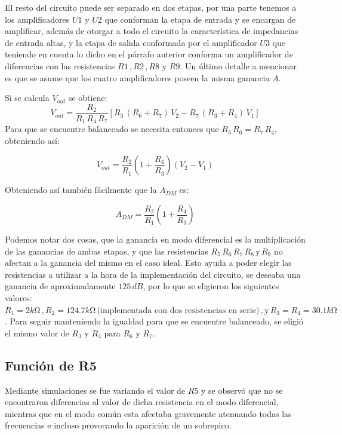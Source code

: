 \documentclass[11pt, a4paper]{article}
\begin{document}
	El resto del circuito puede ser separado en dos etapas, por una parte tenemos a los amplificadores $\mathit{U1}$ y $\mathit{U2}$ que conforman la etapa de entrada y se encargan de amplificar, además de otorgar a todo el circuito la característica de impedancias de entrada altas, y la etapa de salida conformada por el amplificador $\mathit{U3}$ que teniendo en cuenta lo dicho en el párrafo anterior conforma un amplificador de diferencias con las resistencias $R1 \, , R2 \, , R8$ y $R9$. Un último detalle a mencionar es que se asume que los cuatro amplificadores poseen la misma ganancia $A$.

	Si se calcula $V_{out}$ se obtiene:
\begin{equation}
V_{out} = \dfrac{R_2}{R_1 \, R_4 \, R_7} [R_3 \, (R_6 + R_7) \,V_2 - R_7 \, (R_3 + R_4) \,V_1]
\label{eq:Vout ideal}
\end{equation}
	Para que se encuentre balanceado se necesita entonces que $R_3 \, R_6 = R_7 \, R_4$, obteniendo así:

\begin{equation}
V_{out} = \dfrac{R_2}{R_1} \left( 1 + \dfrac{R_4}{R_3} \right) (V_2 - V_1)
\label{eq:Vout ideal balanceado}
\end{equation}

	Obteniendo así también fácilmente que la $A_{DM}$ es:
	
\begin{equation}
A_{DM} = \dfrac{R_2}{R_1} \left( 1 + \dfrac{R_4}{R_3} \right)
\label{eq:ADM caso ideal}
\end{equation}

	Podemos notar dos cosas, que la ganancia en modo diferencial es la multiplicación de las ganancias de ambas etapas, y que las resistencias $R_5 \, R_6 \, R_7 \, R_8 \, \text{y} \, R_9$ no afectan a la ganancia del mismo en el caso ideal.
	Esto ayuda a poder elegir las resistencias a utilizar a la hora de la implementación del circuito, se deseaba una ganancia de aproximadamente $125 \, dB$, por lo que se eligieron los siguientes valores: $R_1 = 2k \si{\ohm} \, , R_2 = 124.7k \si{\ohm} \, \text{(implementada con dos resistencias en serie)} \, , \text{y} \, R_3 = R_4 = 30.1k \si{\ohm}$. Para seguir manteniendo la igualdad para que se encuentre balanceado, se eligió el mismo valor de $R_3$ y $R_4$ para $R_6$ y $R_7$.

\subsection{Función de R5}
	Mediante simulaciones se fue variando el valor de $R5$ y se observó que no se encontraron diferencias al valor de dicha resistencia en el modo diferencial, mientras que en el modo común esta afectaba gravemente atenuando todas las frecuencias e incluso provocando la aparición de un sobrepico.
	
\end{document}
